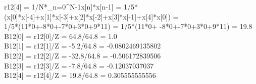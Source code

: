 \documentclass[landscape, 12pt]{report}
\begin{document}
r12[4] = 1/N*\sum_{n=0}^{N-1}{x[n]*x[n-1]} = 1/5*(x[0]*x[-4]+x[1]*x[-3]+x[2]*x[-2]+x[3]*x[-1]+x[4]*x[0]) = \\1/5*(11*0+-8*0+-7*0+3*0+9*11) = 1/5*(11*0+
-8*0+-7*0+3*0+9*11) = 19.8\\

B12[0] = r12[0]/Z = 64.8/64.8 = 1.0\\
B12[1] = r12[1]/Z = -5.2/64.8 = -0.0802469135802\\
B12[2] = r12[2]/Z = -32.8/64.8 = -0.506172839506\\
B12[3] = r12[3]/Z = -7.8/64.8 = -0.12037037037\\
B12[4] = r12[4]/Z = 19.8/64.8 = 0.305555555556\\
\end{document}
